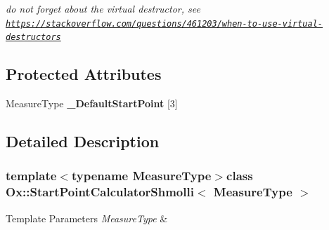 \begin{DoxyCompactItemize}
\begin{DoxyCompactList}\small\item\em do not forget about the virtual destructor, see \href{https://stackoverflow.com/questions/461203/when-to-use-virtual-destructors}{\tt https\-://stackoverflow.\-com/questions/461203/when-\/to-\/use-\/virtual-\/destructors} \end{DoxyCompactList}\end{DoxyCompactItemize}
\subsection*{Protected Attributes}
\begin{DoxyCompactItemize}
\item 
\hypertarget{class_ox_1_1_start_point_calculator_shmolli_acb458533b900c9088d1dd7be30183ba0}{Measure\-Type {\bfseries \-\_\-\-Default\-Start\-Point} \mbox{[}3\mbox{]}}\label{class_ox_1_1_start_point_calculator_shmolli_acb458533b900c9088d1dd7be30183ba0}

\end{DoxyCompactItemize}


\subsection{Detailed Description}
\subsubsection*{template$<$typename Measure\-Type$>$class Ox\-::\-Start\-Point\-Calculator\-Shmolli$<$ Measure\-Type $>$}


\begin{DoxyTemplParams}{Template Parameters}
{\em Measure\-Type} & \\
\hline
\end{DoxyTemplParams}


